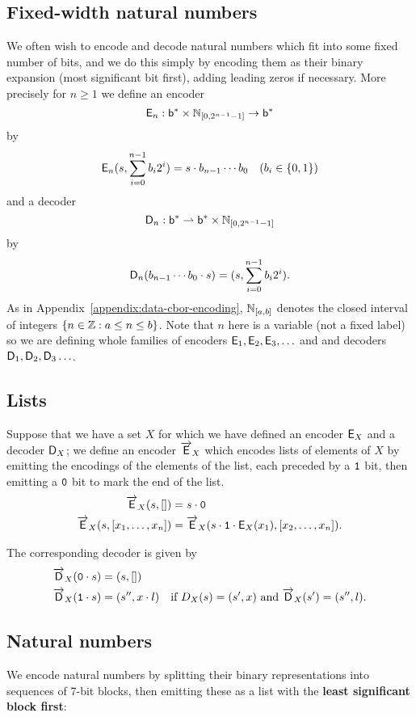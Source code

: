 \subsection{Fixed-width natural numbers}
We often wish to encode and decode natural numbers which fit into some fixed
number of bits, and we do this simply by encoding them as their binary expansion
(most significant bit first), adding leading zeros if necessary.  More precisely
for $n \geq 1$ we define an encoder
$$
\mathsf{E}_n : \mathsf{b}^* \times \mathbb{N}_{[0,2^{n-1}-1]} \rightarrow \mathsf{b}^*
$$
by
$$
\mathsf{E}_n(s, \sum^{n-1}_{i=0}b_i2^i) = s \cdot b_{n-1} \cdots b_0 \quad \text{($b_i \in \{0,1\}$)}
$$
and a decoder
$$
\mathsf{D}_n : \mathsf{b}^* \rightharpoonup \mathsf{b}^* \times \mathbb{N}_{[0,2^{n-1}-1]}
$$
by
$$
\mathsf{D}_n(b_{n-1}\cdots{b_0} \cdot s)= (s,\sum^{n-1}_{i=0}b_i2^i).
$$ As in Appendix~\ref{appendix:data-cbor-encoding}, $\mathbb{N}_{[a,b]}$
denotes the closed interval of integers $\{n \in \mathbb{Z} : a \leq n \leq b\}$.  Note
that $n$ here is a variable (not a fixed label) so we are defining whole
families of encoders $\mathsf{E}_1, \mathsf{E}_2, \mathsf{E}_3, \ldots$ and and decoders $\mathsf{D}_1, \mathsf{D}_2,
\mathsf{D}_3\ldots$.


\subsection{Lists}
Suppose that we have a set $X$ for which we have defined an encoder $\mathsf{E}_X$ and a
decoder $\mathsf{D}_X$; we define an encoder $\overrightarrow{\mathsf{E}}_X$ which encodes lists of elements
of $X$ by emitting the encodings of the elements of the list, each preceded by a
$\mathtt{1}$ bit, then emitting a $\mathtt{0}$ bit to mark the end of the list.
\begin{align*}
  \overrightarrow{\mathsf{E}}_X(s,[]) &= s \cdot \mathtt{0} \\
  \overrightarrow{\mathsf{E}}_X(s,[x_1, \ldots, x_n]) &= \overrightarrow{\mathsf{E}}_X (s \cdot \mathtt{1} \cdot \mathsf{E}_X(x_1), [x_2, \ldots, x_n]).
\end{align*}

\noindent The corresponding decoder is given by
\begin{align*}
\overrightarrow{\mathsf{D}}_X(\mathtt{0} \cdot s) &= (s,[])\\
\overrightarrow{\mathsf{D}}_X(\mathtt{1} \cdot s) &= (s'', x \cdot l) \quad \text{if $D_X(s) = (s', x)$ and $\overrightarrow{\mathsf{D}}_X(s') = (s'', l).$}
\end{align*}

\subsection{Natural numbers}
We encode natural numbers by splitting their binary representations into
sequences of 7-bit blocks, then emitting these as a list with the \textbf{least
  significant block first}:

